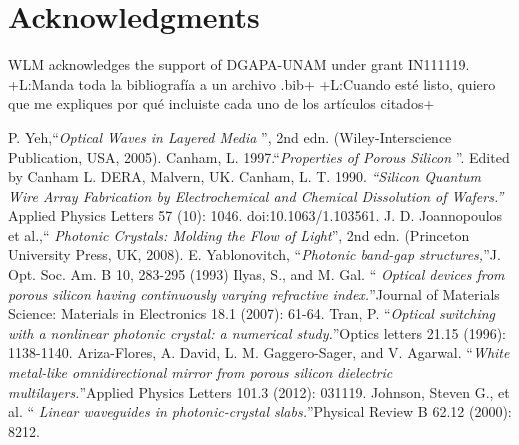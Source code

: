 \documentclass{article}
\newcommand{\notaL}[1]{{\color{blue}+L:#1+}}
\begin{document}
\section*{Acknowledgments}
\label{sec:acknowledgments}
WLM acknowledges the support of DGAPA-UNAM under grant IN111119.
%
\notaL{Manda toda la bibliografía a un archivo .bib}
\notaL{Cuando esté listo, quiero que me expliques por qué incluiste
  cada uno de los artículos citados}

\begin{thebibliography}{X}
 P. Yeh,\textquotedblleft \emph{Optical Waves in Layered
    Media} \textquotedblright, 2nd edn. (Wiley-Interscience
  Publication,
  USA, 2005).
Canham, L. 1997.\textquotedblleft \emph{Properties of
    Porous Silicon} \textquotedblright. Edited by Canham L. DERA,
  Malvern, UK.
Canham, L. T. 1990. \emph{\textquotedblleft Silicon
    Quantum Wire Array Fabrication by Electrochemical and Chemical
    Dissolution of Wafers.\textquotedblright} Applied Physics
  Letters 57 (10): 1046. doi:10.1063/1.103561.
 J. D. Joannopoulos et al.,\textquotedblleft
  \emph{Photonic Crystals: Molding the Flow of
    Light}\textquotedblright, 2nd edn.
  (Princeton University Press, UK, 2008).
 E. Yablonovitch, \textquotedblleft \emph{Photonic
    band-gap structures,}\textquotedblright J. Opt. Soc. Am. B 10,
  283-295 (1993)
 Ilyas, S., and M. Gal.  \textquotedblleft \emph{
    Optical devices from porous silicon having continuously varying
    refractive index.}\textquotedblright Journal of Materials
  Science: Materials in Electronics 18.1 (2007): 61-64.
 Tran, P. \textquotedblleft \emph{Optical switching with
    a nonlinear photonic crystal: a numerical
    study.}\textquotedblright Optics letters 21.15 (1996):
  1138-1140.
 Ariza-Flores, A. David, L. M. Gaggero-Sager, and
  V. Agarwal. \textquotedblleft \emph{White metal-like
    omnidirectional mirror from porous silicon dielectric
    multilayers.}\textquotedblright Applied Physics Letters 101.3
  (2012): 031119.
 Johnson, Steven G., et al.  \textquotedblleft
  \emph{Linear waveguides in photonic-crystal
    slabs.}\textquotedblright Physical Review B 62.12 (2000): 8212.


\end{thebibliography}
\end{document}
